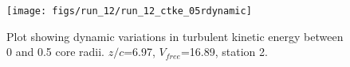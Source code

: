 \begin{figure}[H]
\centering
\texttt{[image: figs/run\_12/run\_12\_ctke\_05rdynamic]}
\caption{Plot showing dynamic variations in turbulent kinetic energy between 0 and 0.5 core radii. $z/c$=6.97, $V_{free}$=16.89, station 2.}
\label{fig:run_12_ctke_05rdynamic}
\end{figure}


